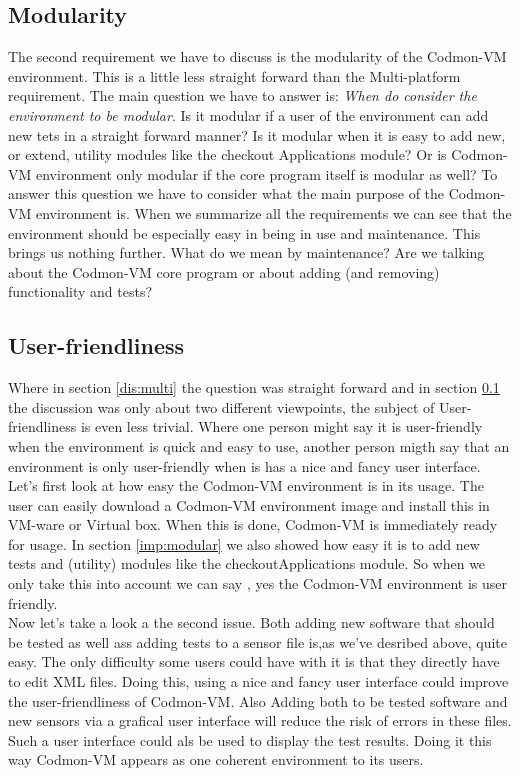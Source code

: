 \documentclass{article}
\newcommand{\project}{Codmon-VM}
\begin{document}
\subsection{Modularity}
\label{dis:modular}
The second requirement we have to discuss is the modularity of the \project{} environment. This is a little less straight forward than the Multi-platform requirement. The main question we have to answer is: 
\emph{When do consider the environment to be modular}. Is it modular if a user of the environment can add new tets in a straight forward manner? Is it modular when it is easy to add new, or extend, utility 
modules like the checkout Applications module? Or is \project{} environment only modular if the core program itself is modular as well? To answer this question we have to consider what the main purpose of the 
\project{} environment is. When we summarize all the requirements we can see that the environment should be especially easy in being in use and maintenance. This brings us nothing further. What do we mean by 
maintenance? Are we talking about the \project{} core program or about adding (and removing) functionality and tests? 

\subsection{User-friendliness}
\label{dis:user}
Where in section \ref{dis:multi} the question was straight forward and in section \ref{dis:modular} the discussion was only about two different viewpoints, the subject of User-friendliness is even less trivial. 
Where one person might say it is user-friendly when the environment is quick and easy to use, another person migth say that an environment is only user-friendly when is has a nice and fancy user interface.\\

\noindent Let's first look at how easy the \project{} environment is in its usage. The user can easily download a \project{} environment image and install this in VM-ware or Virtual box. When this is done, 
\project{} is immediately ready for usage. In section \ref{imp:modular} we also showed how easy it is to add new tests and (utility) modules like the checkoutApplications module. So when we only take this into 
account we can say , yes the \project{} environment is user friendly.\\

\noindent Now let's take a look a the second issue. Both adding new software that should be tested as well ass adding tests to a sensor file is,as we've desribed above, quite easy. The only difficulty some users 
could have with it is that they directly have to edit XML files. Doing this, using a nice and fancy user interface could improve the user-friendliness of \project{}. Also Adding both to be tested software and new 
sensors via a grafical user interface will reduce the risk of errors in these files. Such a user interface could als be used to display the test results. Doing it this way \project{} appears as one coherent 
environment to its users.
\end{document}
